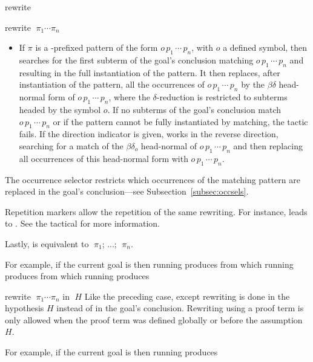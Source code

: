 \begin{tactic}{rewrite}
\begin{tsyntax}{rewrite $\;\pi_1 \cdots \pi_n$}
\begin{itemize}
    \item If $\pi$ is a \ec{/}-prefixed pattern of the form
      $o\,p_1\,\cdots\,p_n$, with $o$ a defined symbol, then
       searches for the first subterm of the goal's
      conclusion matching $o\,p_1\,\cdots\,p_n$ and resulting in the
      full instantiation of the pattern. It then replaces, after
      instantiation of the pattern, all the occurrences of
      $o\,p_1\,\cdots\,p_n$ by the $\beta\delta$ head-normal form of
      $o\,p_1\,\cdots\,p_n$, where the $\delta$-reduction is
      restricted to subterms headed by the symbol $o$. If no subterms
      of the goal's conclusion match $o\,p_1\,\cdots\,p_n$ or if the
      pattern cannot be fully instantiated by matching, the tactic
      fails. If the direction indicator \ec{-} is given, 
      works in the reverse direction, searching for a match of the
      $\beta\delta_o$ head-normal of $o\,p_1\,\cdots\,p_n$ and then
      replacing all occurrences of this head-normal form with
      $o\,p_1\,\cdots\,p_n$.
    \end{itemize}
    
    \smallskip
    The occurrence selector restricts which occurrences of the
    matching pattern are replaced in the goal's conclusion---see
    Subsection~\ref{subsec:occsels}.

    Repetition markers allow the repetition of the same rewriting. For
    instance,  leads to . See the tactical  for more information.
    
    Lastly,  is equivalent to
     $\;\pi_1$; ...;  $\;\pi_n$.

    \smallskip
    For example, if the current goal is
     then
    running 
    produces 
    from which
    running 
    produces 
    from which
    running 
    produces 
  \end{tsyntax}

  \begin{tsyntax}{rewrite $\;\pi_1 \cdots \pi_n$ in $\;H$} Like the
    preceding case, except rewriting is done in the hypothesis
    $H$ instead of in the goal's conclusion.  Rewriting using a proof
    term is only allowed when the proof term was defined globally
    or before the assumption $H$.

    For example, if the current goal is
     then
    running 
    produces 
  \end{tsyntax}
\end{tactic}
